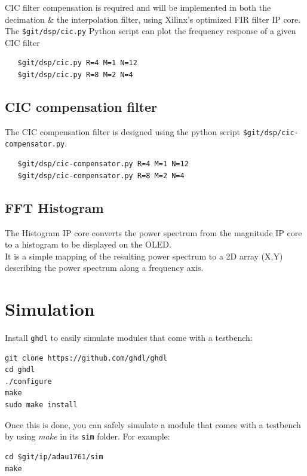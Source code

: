 \documentclass{article}
\begin{document}
CIC filter compensation is
required and will be implemented in both the decimation
\& the interpolation filter, using
Xilinx's optimized FIR filter IP core. \\

The {\tt \$git/dsp/cic.py} Python script 
can plot the frequency response
of a given CIC filter

\begin{verbatim}
   $git/dsp/cic.py R=4 M=1 N=12
   $git/dsp/cic.py R=8 M=2 N=4
\end{verbatim}

\subsection{CIC compensation filter}

The CIC compensation filter is designed
using the python script {\tt \$git/dsp/cic-compensator.py}. 

\begin{verbatim}
   $git/dsp/cic-compensator.py R=4 M=1 N=12
   $git/dsp/cic-compensator.py R=8 M=2 N=4
\end{verbatim}

\subsection{FFT Histogram}

The Histogram IP core converts
the power spectrum from the
magnitude IP core
to a histogram to be displayed on the OLED. \\

It is a simple mapping of the resulting
power spectrum to a 2D array (X,Y) describing
the power spectrum along a frequency axis. \\ 


\section{Simulation}

Install {\tt ghdl} to easily
simulate modules that come with a testbench:

\begin{verbatim}
git clone https://github.com/ghdl/ghdl
cd ghdl
./configure
make
sudo make install
\end{verbatim}

Once this is done, you can safely simulate a module
that comes with a testbench by using {\it make}
in its {\tt sim} folder.
For example:

\begin{verbatim}
cd $git/ip/adau1761/sim
make
\end{verbatim}
\end{document}

